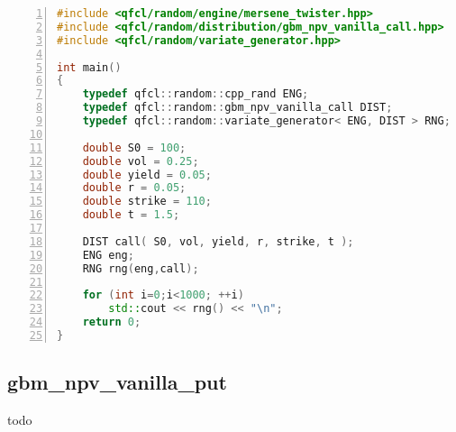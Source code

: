 %
\begin{lstlisting}[language=C++,caption=Sample C++ code: function interface,numbers=left]
#include <qfcl/random/engine/mersene_twister.hpp>
#include <qfcl/random/distribution/gbm_npv_vanilla_call.hpp>
#include <qfcl/random/variate_generator.hpp>

int main()
{
    typedef qfcl::random::cpp_rand ENG;
    typedef qfcl::random::gbm_npv_vanilla_call DIST;
    typedef qfcl::random::variate_generator< ENG, DIST > RNG;
    
    double S0 = 100;
    double vol = 0.25;
    double yield = 0.05;
    double r = 0.05; 
    double strike = 110;
    double t = 1.5;
    
    DIST call( S0, vol, yield, r, strike, t );
    ENG eng;
    RNG rng(eng,call);
    
    for (int i=0;i<1000; ++i) 
    	std::cout << rng() << "\n";
    return 0;
}
\end{lstlisting}



\subsection{gbm\_npv\_vanilla\_put}
todo